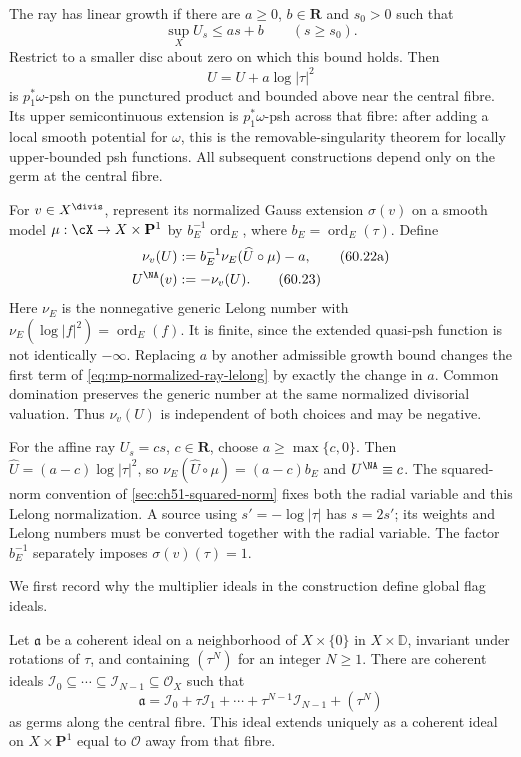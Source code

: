 The ray has linear growth if there are $a\geq0$, $b\in\mathbf R$ and $s_0>0$ such that
\[
                  \sup_XU_s\leq as+b\qquad(s\geq s_0).
\tag{60.22}\label{eq:mp-ray-linear-growth}
\]
Restrict to a smaller disc about zero on which this bound holds. Then
\[
                         \widehat U=U+a\log|\tau|^2
\]
is $p_1^*\omega$-psh on the punctured product and bounded above near the central fibre. Its upper semicontinuous extension is $p_1^*\omega$-psh across that fibre: after adding a local smooth potential for $\omega$, this is the removable-singularity theorem for locally upper-bounded psh functions. All subsequent constructions depend only on the germ at the central fibre.

For $v\in X^{\divis}$, represent its normalized Gauss extension $\sigma(v)$ on a smooth model $\mu:\cX\to X\times\mathbf P^1$ by $b_E^{-1}\operatorname{ord}_E$, where $b_E=\operatorname{ord}_E(\tau)$. Define
\begin{align}
 \nu_v(U)&:=b_E^{-1}\nu_E(\widehat U\circ\mu)-a,
 \tag{60.22a}\label{eq:mp-normalized-ray-lelong}\\
 U^{\NA}(v)&:=-\nu_v(U).
 \tag{60.23}\label{eq:mp-ray-na-value}
\end{align}
Here $\nu_E$ is the nonnegative generic Lelong number with $\nu_E(\log|f|^2)=\operatorname{ord}_E(f)$. It is finite, since the extended quasi-psh function is not identically $-\infty$. Replacing $a$ by another admissible growth bound changes the first term of \eqref{eq:mp-normalized-ray-lelong} by exactly the change in $a$. Common domination preserves the generic number at the same normalized divisorial valuation. Thus $\nu_v(U)$ is independent of both choices and may be negative.

For the affine ray $U_s=cs$, $c\in\mathbf R$, choose $a\geq\max\{c,0\}$. Then $\widehat U=(a-c)\log|\tau|^2$, so $\nu_E(\widehat U\circ\mu)=(a-c)b_E$ and $U^{\NA}\equiv c$. The squared-norm convention of \cref{sec:ch51-squared-norm} fixes both the radial variable and this Lelong normalization. A source using $s'=-\log|\tau|$ has $s=2s'$; its weights and Lelong numbers must be converted together with the radial variable. The factor $b_E^{-1}$ separately imposes $\sigma(v)(\tau)=1$.

We first record why the multiplier ideals in the construction define global flag ideals.

\begin{lemma}\label{lem:mp-invariant-flag-expansion}
Let $\mathfrak a$ be a coherent ideal on a neighborhood of $X\times\{0\}$ in $X\times\mathbb D$, invariant under rotations of $\tau$, and containing $(\tau^N)$ for an integer $N\geq1$. There are coherent ideals $\mathcal I_0\subseteq\cdots\subseteq\mathcal I_{N-1}\subseteq\mathcal O_X$ such that
\[
 \mathfrak a=\mathcal I_0+\tau\mathcal I_1+\cdots+
                    \tau^{N-1}\mathcal I_{N-1}+(\tau^N)
\tag{60.23b}\label{eq:mp-invariant-flag-expansion}
\]
as germs along the central fibre. This ideal extends uniquely as a coherent ideal on $X\times\mathbf P^1$ equal to $\mathcal O$ away from that fibre.
\end{lemma}

